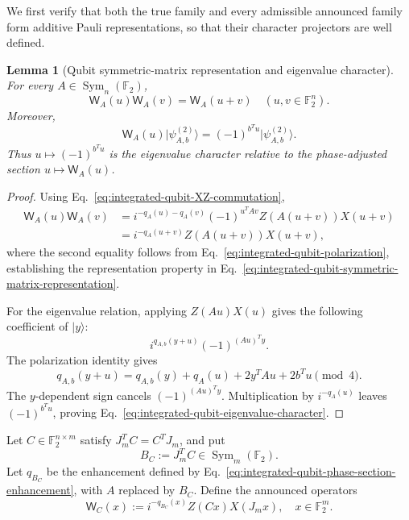 \documentclass[11pt]{article}
\newcommand{\F}{\mathbb F}
\newcommand{\Sym}{\operatorname{Sym}}
\newcommand{\1}{\mathbf 1}
\newcommand{\ket}[1]{\lvert #1\rangle}
\theoremstyle{plain}
\newtheorem{lemma}[theorem]{Lemma}
\theoremstyle{definition}
\theoremstyle{remark}
\begin{document}
We first verify that both the true family and every admissible announced family form additive Pauli representations, so that their character projectors are
well defined.

\begin{lemma}[Qubit symmetric-matrix representation and eigenvalue character]
\label{lem:integrated-qubit-symmetric-matrix-representation}
For every $A\in\Sym_n(\F_2)$,
\begin{equation}
 \mathsf W_A(u)\mathsf W_A(v)=\mathsf W_A(u+v)
 \quad(u,v\in\F_2^n).
 \label{eq:integrated-qubit-symmetric-matrix-representation}
\end{equation}
Moreover,
\begin{equation}
 \mathsf W_A(u)\ket{\psi_{A,b}^{(2)}}
 =(-1)^{b^Tu}\ket{\psi_{A,b}^{(2)}}.
 \label{eq:integrated-qubit-eigenvalue-character}
\end{equation}
Thus $u\mapsto(-1)^{b^Tu}$ is the eigenvalue character relative to the
phase-adjusted section $u\mapsto\mathsf W_A(u)$.
\end{lemma}
\begin{proof}
Using Eq.~\eqref{eq:integrated-qubit-XZ-commutation},
\begin{align*}
 \mathsf W_A(u)\mathsf W_A(v)
 &=i^{-q_A(u)-q_A(v)}(-1)^{u^TAv}
   Z(A(u+v))X(u+v)\\
 &=i^{-q_A(u+v)}Z(A(u+v))X(u+v),
\end{align*}
where the second equality follows from Eq.~\eqref{eq:integrated-qubit-polarization}, establishing the representation property in Eq.~\eqref{eq:integrated-qubit-symmetric-matrix-representation}.

For the eigenvalue relation, applying $Z(Au)X(u)$ gives the following coefficient of $\ket{y}$:
\[
 i^{q_{A,b}(y+u)}(-1)^{(Au)^Ty}.
\]
The polarization identity gives
\[
 q_{A,b}(y+u)
 =q_{A,b}(y)+q_A(u)+2y^TAu+2b^Tu\pmod4.
\]
The $y$-dependent sign cancels $(-1)^{(Au)^Ty}$.  Multiplication by
$i^{-q_A(u)}$ leaves $(-1)^{b^Tu}$, proving
Eq.~\eqref{eq:integrated-qubit-eigenvalue-character}.
\end{proof}

Let $C\in\F_2^{n\times m}$ satisfy
$J_m^TC=C^TJ_m$, and put
\begin{equation}
 B_C:=J_m^TC\in\Sym_m(\F_2).
 \label{eq:integrated-qubit-announced-B}
\end{equation}
Let $q_{B_C}$ be the enhancement defined by
Eq.~\eqref{eq:integrated-qubit-phase-section-enhancement}, with $A$ replaced by
$B_C$.  Define the announced operators
\begin{equation}
 \mathsf W_C(x):=
 i^{-q_{B_C}(x)}Z(Cx)X(J_mx),
 \quad x\in\F_2^m.
 \label{eq:integrated-qubit-announced-Pauli}
\end{equation}
\end{document}
